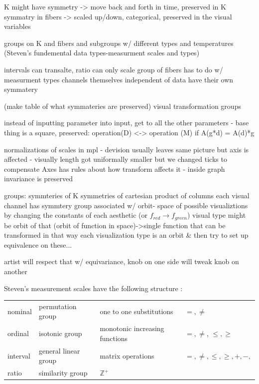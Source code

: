 \documentclass[letterpaper,onecolumn,titlepage]{Ythesis}
\begin{document}
K might have symmetry -> move back and forth in time, preserved in K
symmatry in fibers -> scaled up/down, categorical,
preserved in the visual variables

groups on K and fibers and subgroups w/ different types and temperatures (Steven's fundemental data types-measurment scales and types)

intervals can transalte, ratio can only scale
group of fibers has to do w/ measurment types
channels themselves independent of data have their own symmatery

(make table of what symmateries are preserved)
visual transformation groups

instead of inputting parameter into input, get to all the other parameters - base thing is a square, 
preserved: operation(D) <-> operation (M)
if A(g*d) = A(d)*g

normalizations of scales in mpl - devision usually leaves same picture but axis is affected - visually length got uniformally smaller but we changed ticks to compensate
Axes has rules about how transform affects it - inside graph invariance is preserved

groups:
symmteries of K
symmetries of cartesian product of columns
each visual channel has symmtery group associated w/
orbit- space of possible visualiztions by changing the constants of each aesthetic (or $f_{red} \rightarrow f_{green}$)  
visual type might be orbit of that (orbit of function in space)->single function that can be transformed in that way
each visualization type is an orbit \& then try to set up equivalence on these...

artist will respect that w/ equivariance, knob on one side will tweak knob on another

Steven's measurement scales have the following structure \cite{stevensTheoryScalesMeasurement1946}:
\begin{table}
    \begin{tabular}{l l l l}
        nominal & permutation group & one to one substitutions & $=, \neq $\\
        ordinal & isotonic group & monotonic increasing functions &  $=, \neq $, $\leq, \geq$\\
        interval & general linear group & matrix operations &  $=, \neq, \leq, \geq, +, -, $\\
        ratio & similarity group & $ \mathbb{Z}^+ $ & 
    \end{tabular}
\end{table}
\end{document}
